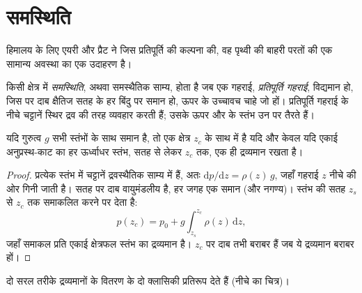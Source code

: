 \section{समस्थिति}

हिमालय के लिए एयरी और प्रैट ने जिस प्रतिपूर्ति की कल्पना की, वह पृथ्वी की बाहरी परतों की एक सामान्य अवस्था का एक उदाहरण है।

\begin{definition}\label{def:b1:isostasy-gravity:isostasy}
किसी क्षेत्र में \emph{समस्थिति}, अथवा समस्थैतिक साम्य, होता है जब एक गहराई, \emph{प्रतिपूर्ति गहराई}, विद्यमान हो, जिस पर दाब क्षैतिज सतह के हर बिंदु पर समान हो, ऊपर के उच्चावच चाहे जो हों। प्रतिपूर्ति गहराई के नीचे चट्टानें स्थिर द्रव की तरह व्यवहार करती हैं; उसके ऊपर  और  के स्तंभ उन पर तैरते हैं।
\end{definition}

\begin{proposition}\label{prop:b1:isostasy-gravity:equal-mass}
यदि गुरुत्व $g$ सभी स्तंभों के साथ समान है, तो एक क्षेत्र  $z_c$ के साथ  में है यदि और केवल यदि एकाई अनुप्रस्थ-काट का हर ऊर्ध्वाधर स्तंभ, सतह से लेकर $z_c$ तक, एक ही द्रव्यमान रखता है।
\end{proposition}

\begin{proof}
प्रत्येक स्तंभ में चट्टानें द्रवस्थैतिक साम्य में हैं, अतः $\mathrm dp/\mathrm dz = \rho(z)\,g$, जहाँ गहराई $z$ नीचे की ओर गिनी जाती है। सतह पर दाब वायुमंडलीय है, हर जगह एक समान (और नगण्य)। स्तंभ की सतह $z_s$ से $z_c$ तक समाकलित करने पर देता है:
\[
  p(z_c) = p_0 + g\int_{z_s}^{z_c}\rho(z)\,\mathrm dz ,
\]
जहाँ समाकल प्रति एकाई क्षेत्रफल स्तंभ का द्रव्यमान है। $z_c$ पर दाब तभी बराबर हैं जब ये द्रव्यमान बराबर हों।
\end{proof}

दो सरल तरीके द्रव्यमानों के वितरण के दो क्लासिकी प्रतिरूप देते हैं (नीचे का चित्र)।


